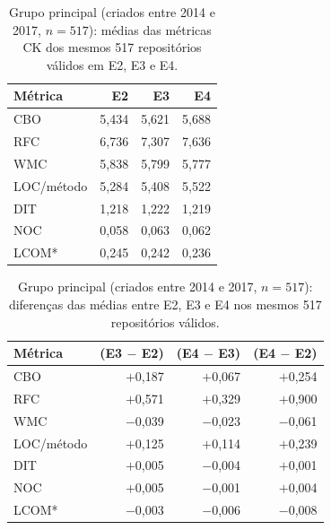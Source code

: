 \begin{table}[htbp]
\centering\footnotesize
\caption{Grupo principal (criados entre 2014 e 2017, $n = 517$): médias das métricas CK dos mesmos 517 repositórios válidos em E2, E3 e E4.}
\label{tab:valores_principal}
\begin{tabular}{lrrr}
\hline
\textbf{Métrica} & \textbf{E2} & \textbf{E3} & \textbf{E4} \\ \hline
CBO & 5,434 & 5,621 & 5,688 \\
RFC & 6,736 & 7,307 & 7,636 \\
WMC & 5,838 & 5,799 & 5,777 \\
LOC/método & 5,284 & 5,408 & 5,522 \\
DIT & 1,218 & 1,222 & 1,219 \\
NOC & 0,058 & 0,063 & 0,062 \\
LCOM* & 0,245 & 0,242 & 0,236 \\
\hline
\end{tabular}
\par\vspace{2pt}{\footnotesize Fonte: Elaborada pelos autores (2026).}
\end{table}

\begin{table}[htbp]
\centering\footnotesize
\caption{Grupo principal (criados entre 2014 e 2017, $n = 517$): diferenças das médias entre E2, E3 e E4 nos mesmos 517 repositórios válidos.}
\label{tab:diferencas_principal}
\begin{tabular}{lrrr}
\hline
\textbf{Métrica} & \textbf{(E3 $-$ E2)} & \textbf{(E4 $-$ E3)} & \textbf{(E4 $-$ E2)} \\ \hline
CBO & $+$0,187 & $+$0,067 & $+$0,254 \\
RFC & $+$0,571 & $+$0,329 & $+$0,900 \\
WMC & $-$0,039 & $-$0,023 & $-$0,061 \\
LOC/método & $+$0,125 & $+$0,114 & $+$0,239 \\
DIT & $+$0,005 & $-$0,004 & $+$0,001 \\
NOC & $+$0,005 & $-$0,001 & $+$0,004 \\
LCOM* & $-$0,003 & $-$0,006 & $-$0,008 \\
\hline
\end{tabular}
\par\vspace{2pt}{\footnotesize Fonte: Elaborada pelos autores (2026). Nota: diferenças calculadas antes do arredondamento.}
\end{table}
